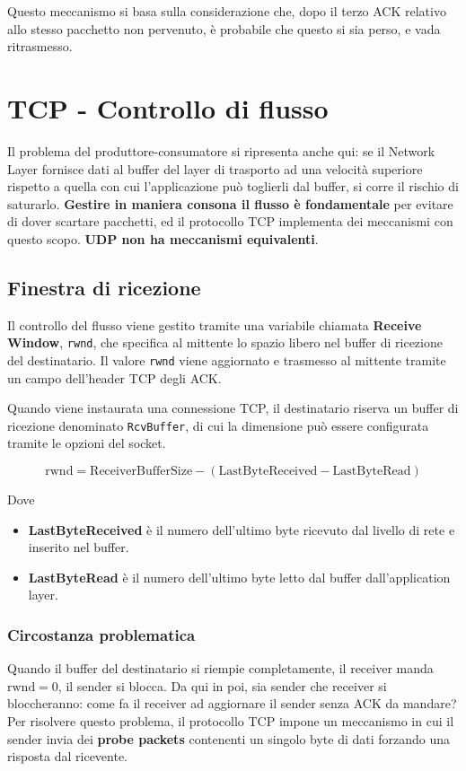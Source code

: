 Questo meccanismo si basa sulla considerazione che, dopo il terzo ACK relativo allo stesso pacchetto non pervenuto, è probabile che questo si sia perso, e vada ritrasmesso. 

\newpage

\section{TCP - Controllo di flusso}
Il problema del produttore-consumatore si ripresenta anche qui: se il Network Layer fornisce dati al buffer del layer di trasporto ad una velocità superiore rispetto a quella con cui l'applicazione può toglierli dal buffer, si corre il rischio di saturarlo.\textbf{ Gestire in maniera consona il flusso è fondamentale} per evitare di dover scartare pacchetti, ed il protocollo TCP implementa dei meccanismi con questo scopo. \textbf{UDP non ha meccanismi equivalenti}.


\subsection{Finestra di ricezione}
Il controllo del flusso viene gestito tramite una variabile chiamata \textbf{Receive Window}, \verb|rwnd|, che specifica al mittente lo spazio libero nel buffer di ricezione del destinatario. Il valore \verb|rwnd| viene aggiornato e trasmesso al mittente tramite un campo dell'header TCP degli ACK.

Quando viene instaurata una connessione TCP, il destinatario riserva un buffer di ricezione denominato \verb|RcvBuffer|, di cui la dimensione può essere configurata tramite le opzioni del socket.

$$
\text{rwnd} = \text{ReceiverBufferSize} - (\text{LastByteReceived} - \text{LastByteRead})
$$

Dove 
\begin{itemize}
	\item \textbf{LastByteReceived} è il numero dell'ultimo byte ricevuto dal livello di rete e inserito nel buffer.
	\item \textbf{LastByteRead} è il numero dell'ultimo byte letto dal buffer dall'application layer.
\end{itemize}

\subsubsection{Circostanza problematica}
Quando il buffer del destinatario si riempie completamente, il receiver manda $\text{rwnd}= 0$, il sender si blocca. Da qui in poi, sia sender che receiver si bloccheranno: come fa il receiver ad aggiornare il sender senza ACK da mandare?
Per risolvere questo problema, il protocollo TCP impone un meccanismo in cui il sender invia dei \textbf{probe packets} contenenti un singolo byte di dati forzando una risposta dal ricevente.

